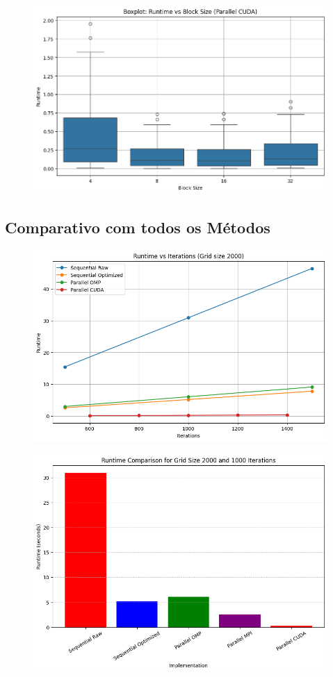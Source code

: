 \begin{figure}[H]
    \centering
    \includegraphics[width=1\linewidth]{./image copy 6.png}
    \label{fig:Runtimexblock}
\end{figure}

\subsection{Comparativo com todos os Métodos}

\begin{figure}[H]
    \centering
    \includegraphics[width=1\linewidth]{./image copy 7.png}
    \label{fig:Runtimexblock}
\end{figure}

\begin{figure}[H]
    \centering
    \includegraphics[width=1\linewidth]{./image copy 9.png}
    \label{fig:Runtimexblock}
\end{figure}
